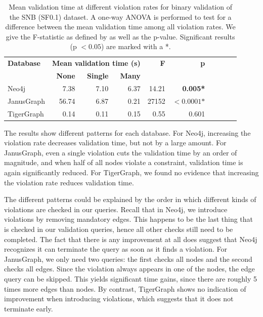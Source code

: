 \documentclass{report}
\theoremstyle{definition}
\begin{document}
\begin{table}[t]
  \centering
  \begin{tabular}{lrrrrrrrrr}
    \hline
    \textbf{Database} & \multicolumn{3}{c}{\textbf{Mean validation time (s)}} & \textbf{F}      & \textbf{p}                                           \\
                      & \textbf{None}                                         & \textbf{Single} & \textbf{Many} &                                      \\
    \hline
    Neo4j             & 7.38                                                  & 7.10            & 6.37          & 14.21 & \textbf{0.005*}              \\
    JanusGraph        & 56.74                                                 & 6.87            & 0.21          & 27152 & $\mathbf{<0.0001}\textbf{*}$ \\
    TigerGraph        & 0.14                                                  & 0.11            & 0.15          & 0.55  & 0.601                        \\
    \hline
  \end{tabular}
  \caption[Mean validation time at different violation rates]{Mean validation time at different violation rates for binary validation of the SNB (SF0.1) dataset. A one-way ANOVA is performed to test for a difference between the mean validation time among all violation rates. We give the F-statistic as defined by \citet{snedecor1989statistical} as well as the p-value. Significant results (p $< 0.05$) are marked with a *.}
  \label{tab:results-violations}
\end{table}

The results show different patterns for each database. For Neo4j, increasing the violation rate decreases validation time, but not by a large amount. For JanusGraph, even a single violation cuts the validation time by an order of magnitude, and when half of all nodes violate a constraint, validation time is again significantly reduced. For TigerGraph, we found no evidence that increasing the violation rate reduces validation time.

The different patterns could be explained by the order in which different kinds of violations are checked in our queries. Recall that in Neo4j, we introduce violations by removing mandatory edges. This happens to be the last thing that is checked in our validation queries, hence all other checks still need to be completed. The fact that there is any improvement at all does suggest that Neo4j recognizes it can terminate the query as soon as it finds a violation. For JanusGraph, we only need two queries: the first checks all nodes and the second checks all edges. Since the violation always appears in one of the nodes, the edge query can be skipped. This yields significant time gains, since there are roughly 5 times more edges than nodes. By contrast, TigerGraph shows no indication of improvement when introducing violations, which suggests that it does not terminate early.
\end{document}
